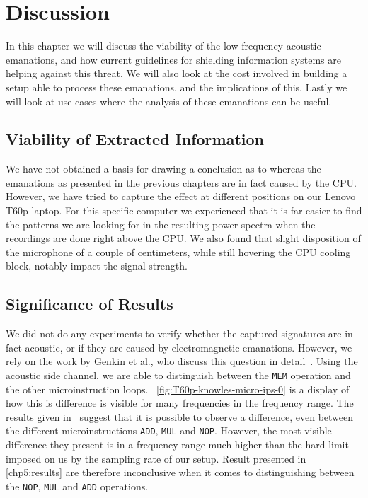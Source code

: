 \chapter{Discussion}\label{chp6:discussion}

In this chapter we will discuss the viability of the low frequency acoustic emanations, and how current guidelines for shielding information systems are helping against this threat.
We will also look at the cost involved in building a setup able to process these emanations, and the implications of this.
Lastly we will look at use cases where the analysis of these emanations can be useful.

\section{Viability of Extracted Information}
We have not obtained a basis for drawing a conclusion as to whereas the emanations as presented in the previous chapters are in fact caused by the \gls{CPU}.
However, we have tried to capture the effect at different positions on our Lenovo T60p laptop. 
For this specific computer we experienced that it is far easier to find the patterns we are looking for in the resulting power spectra when the recordings are done right above the \gls{CPU}.
We also found that slight disposition of the microphone of a couple of centimeters, while still hovering the \gls{CPU} cooling block, notably impact the signal strength.


\section{Significance of Results}

We did not do any experiments to verify whether the captured signatures are in fact acoustic, or if they are caused by electromagnetic emanations.
However, we rely on the work by Genkin et al., who discuss this question in detail~\cite[Section 3.3]{DBLP:journals/iacr/GenkinST13}.
Using the acoustic side channel, we are able to distinguish between the \texttt{MEM} operation and the other microinstruction loops.
~\autoref{fig:T60p-knowles-micro-ips-0} is a display of how this is difference is visible for many frequencies in the frequency range.
The results given in~\cite[Fig.~2]{DBLP:conf/crypto/GenkinST14} suggest that it is possible to observe a difference, even between the different microinstructions \texttt{ADD}, \texttt{MUL} and \texttt{NOP}. 
However, the most visible difference they present is in a frequency range much higher than the hard limit imposed on us by the sampling rate of our setup.
Result presented in \autoref{chp5:results} are therefore inconclusive when it comes to distinguishing between the \texttt{NOP}, \texttt{MUL} and \texttt{ADD} operations.


